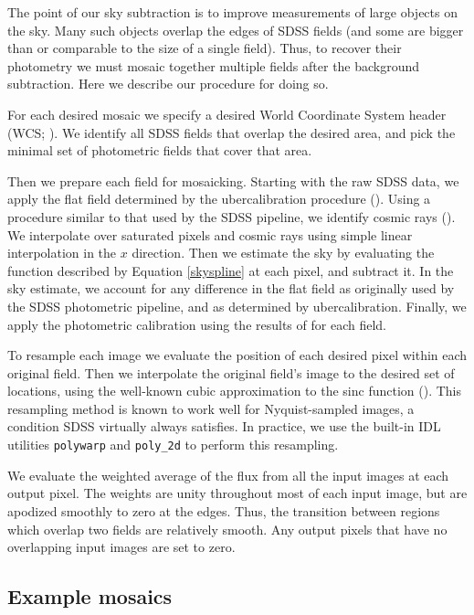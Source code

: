 \documentclass[10pt,preprint]{aastex}
\begin{document}
The point of our sky subtraction is to improve measurements of large
objects on the sky.  Many such objects overlap the edges of SDSS
fields (and some are bigger than or comparable to the size of a single
field).  Thus, to recover their photometry we must mosaic together
multiple fields after the background subtraction. Here we describe our
procedure for doing so.

For each desired mosaic we specify a desired World Coordinate System
header (WCS; \citealt{greisen02a}). We identify all SDSS fields that
overlap the desired area, and pick the minimal set of photometric
fields that cover that area.

Then we prepare each field for mosaicking.  Starting with the raw SDSS
data, we apply the flat field determined by the ubercalibration
procedure (\citealt{padmanabhan07b}). Using a procedure similar to
that used by the SDSS pipeline, we identify cosmic rays
(\citealt{lupton01a}). We interpolate over saturated pixels and cosmic
rays using simple linear interpolation in the $x$ direction.  Then we
estimate the sky by evaluating the function described by Equation
\ref{skyspline} at each pixel, and subtract it. In the sky estimate,
we account for any difference in the flat field as originally used by
the SDSS photometric pipeline, and as determined by
ubercalibration. Finally, we apply the photometric calibration using
the results of \citet{padmanabhan07b} for each field.

To resample each image we evaluate the position of each desired pixel
within each original field. Then we interpolate the original field's
image to the desired set of locations, using the well-known cubic
approximation to the sinc function (\citealt{park83a}). This
resampling method is known to work well for Nyquist-sampled images, a
condition SDSS virtually always satisfies. In practice, we use the
built-in IDL utilities {\tt polywarp} and {\tt poly\_2d} to perform
this resampling.

We evaluate the weighted average of the flux from all the input images
at each output pixel. The weights are unity throughout most of each
input image, but are apodized smoothly to zero at the edges. Thus, the
transition between regions which overlap two fields are relatively
smooth. Any output pixels that have no overlapping input images are
set to zero.

\subsection{Example mosaics}
\end{document}
